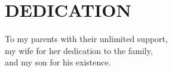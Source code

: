 \section*{DEDICATION}

\begin{center}
To my parents with their unlimited support, \\my wife for her dedication to the family,\\ and my son for his existence. \end{center}
